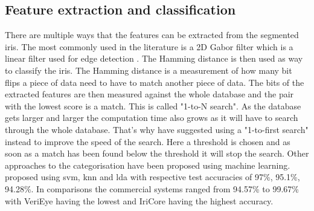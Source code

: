 \subsection{Feature extraction and classification}
There are multiple ways that the features can be extracted from the segmented iris. The most commonly used in the literature is a 2D Gabor filter which is a linear filter used for edge detection \citep{Daugman1993}. The Hamming distance is then used as way to classify the iris. The Hamming distance is a measurement of how many bit flips a piece of data need to have to match another piece of data. The bits of the extracted features are then measured against the whole database and the pair with the lowest score is a match. This is called "1-to-N search". As the database gets larger and larger the computation time also grows as it will have to search through the whole database. That's why \cite{Kuehlkamp2016} have suggested using a "1-to-first search" instead to improve the speed of the search. Here a threshold is chosen and as soon as a match has been found below the threshold it will stop the search. Other approaches to the categorisation have been proposed using machine learning. \cite{Khan2017} proposed using \gls{svm}, \gls{knn} and \gls{lda} with respective test accuracies of 97\%, 95.1\%, 94.28\%. In comparisons the  commercial systems ranged from 94.57\% to  99.67\% with VeriEye having the lowest and IriCore having the highest accuracy. 

